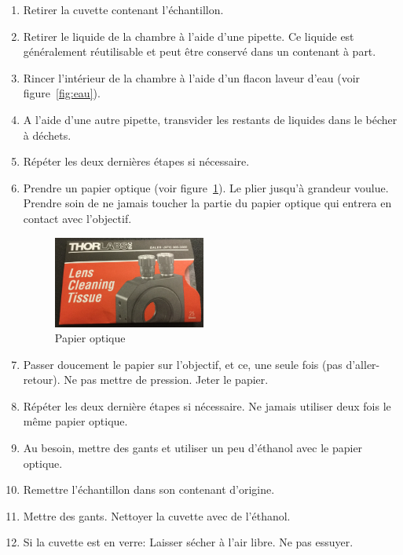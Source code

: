 \begin{enumerate}
    \item \label{skip} Retirer la cuvette contenant l'échantillon.
    \item Retirer le liquide de la chambre à l'aide d'une pipette. Ce liquide est généralement réutilisable et peut être conservé dans un contenant à part.
    \item Rincer l'intérieur de la chambre à l'aide d'un flacon laveur d'eau (voir figure~\ref{fig:eau}).
    \item A l'aide d'une autre pipette, transvider les restants de liquides dans le bécher à déchets.
    \item Répéter les deux dernières étapes si nécessaire.
    \item Prendre un papier optique (voir figure~\ref{fig:papier}). Le plier jusqu'à grandeur voulue. Prendre soin de ne jamais toucher la partie du papier optique qui entrera en contact avec l'objectif. 
        \begin{figure}[H]
        \centering
        \includegraphics[width=5cm]{papier.jpg}
        \caption{Papier optique}
        \label{fig:papier}
        \end{figure}
    \item Passer doucement le papier sur l'objectif, et ce, une seule fois (pas d'aller-retour). Ne pas mettre de pression. Jeter le papier.
    \item Répéter les deux dernière étapes si nécessaire. Ne jamais utiliser deux fois le même papier optique.
    \item Au besoin, mettre des gants et utiliser un peu d'éthanol avec le papier optique.
    \item Remettre l'échantillon dans son contenant d'origine.
    \item Mettre des gants. Nettoyer la cuvette avec de l'éthanol. \item Si la cuvette est en verre: Laisser sécher à l'air libre. Ne pas essuyer.
\end{enumerate}